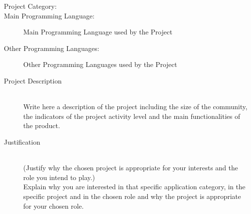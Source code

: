 \documentclass[runningheads]{llncs}
\begin{document}
\begin{description}
  \item[Project Category:]  %
  \item[Main Programming Language:]
    Main Programming Language used by the Project %
  \item[Other Programming Languages:]
    Other Programming Languages used by the Project %
\end{description}
\begin{description}
  \item[Project Description]\mbox{}\\
    Write here a description of the project including the size of the community, the indicators of the project activity level
    and the main functionalities of the product. %
\end{description}
\begin{description}
  \item[Justification]\mbox{}\\
   (Justify why the chosen project is appropriate for your interests and the role you intend to play.)\\
   Explain why you are interested in that specific application category, in the specific project and in the chosen role
   and why the project is appropriate for your chosen role. %
\end{description}
\end{document}
